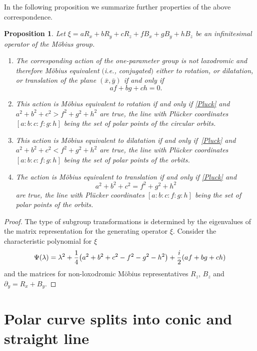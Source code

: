 \documentclass[11pt]{article}
\numberwithin{equation}{section}
\numberwithin{equation}{section}
\newtheorem{Proposition}[Theorem]{Proposition}
 { \theoremstyle{definition}
\newtheorem{Definition}[Theorem]{Definition}
\newtheorem{Note}[Theorem]{Note}
\newtheorem{Example}[Theorem]{Example}
\newtheorem{Remark}[Theorem]{Remark} }
\begin{document}
In the following proposition we summarize further properties of the above correspondence.
\begin{Proposition}\label{operline}
Let $\xi =aR_x+bR_y+cR_z+fB_x+gB_y+hB_z$ be an infinitesimal operator of the M\"obius group.
\begin{enumerate}\itemsep=0pt
\item[$(1)$] The corresponding action of the one-parameter group is not loxodromic and therefore M\"obius equivalent $($i.e., conjugated$)$ either to rotation, or dilatation, or translation of the plane $(\bar{x},\bar{y})$ if and only if \begin{equation}\label{Pluck}
af+bg+ch=0.
\end{equation}
\item[$(2)$] This action is M\"obius equivalent to rotation if and only if \eqref{Pluck} and
$a^2+b^2+c^2>f^2+g^2+h^2$ are true, the line with Pl\"ucker coordinates $[a:b:c:f:g:h]$ being the set of polar points of the circular orbits.
\item[$(3)$] This action is M\"obius equivalent to dilatation if and only if~\eqref{Pluck} and
$a^2+b^2+c^2<f^2+g^2+h^2$ are true, the line with Pl\"ucker coordinates $[a:b:c:f:g:h]$ being the set of polar points of the orbits.
\item[$(4)$] The action is M\"obius equivalent to translation if and only if \eqref{Pluck} and
\begin{equation}\label{quadrcomplex}
a^2+b^2+c^2=f^2+g^2+h^2
\end{equation} are true, the line with Pl\"ucker coordinates $[a:b:c:f:g:h]$ being the set of polar points of the orbits.
\end{enumerate}
\end{Proposition}
\begin{proof}
The type of subgroup transformations is determined by the eigenvalues of the matrix representation for the generating operator $\xi$. Consider the characteristic polynomial for $\xi$
\[
\Psi (\lambda)=\lambda^2 +\frac{1}{4}\bigl( a^2 + b^2 + c^2 - f^2 - g^2 - h^2\bigr)+\frac{\rm i}{2}(af + bg +ch)
\]
and the matrices for non-loxodromic M\"obius representatives $R_z$, $B_z$ and $\partial_y=R_x+B_y$.
\end{proof}

\setcounter{section}{4}\setcounter{figure}{4}
\section{Polar curve splits into conic and straight line}\label{split}
\end{document}
